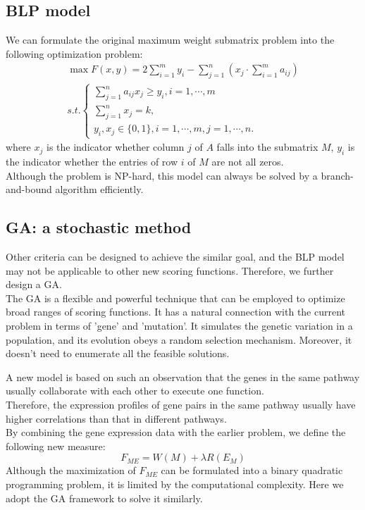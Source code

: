 \documentclass[xcolor=dvipsnames]{beamer}
\begin{document}
\subsection{BLP model}
\begin{frame}
We can formulate the original maximum weight submatrix problem into the following optimization problem:\\
\begin{eqnarray}
\max F(x,y)=2\sum_{i=1}^my_i-\sum_{j=1}^n(x_j\cdot\sum_{i=1}^ma_{ij})\nonumber\\
s.t.
\left\{
\begin{array}{c}
\sum_{j=1}^na_{ij}x_j\geqslant y_i, i=1,\cdots,m\\
\sum_{j=1}^nx_j=k,\\
y_i,x_j\in\{0,1\},i=1,\cdots,m,j=1,\cdots,n.
\end{array}
\right.\nonumber
\end{eqnarray}
where $x_j$ is the indicator whether column $j$ of $A$ falls into the submatrix $M$, $y_i$ is the indicator whether the entries of row $i$ of $M$ are not all zeros.\\
Although the problem is NP-hard, this model can always be solved by a branch-and-bound algorithm efficiently.\\
\end{frame}
\subsection{GA: a stochastic method}
\begin{frame}
Other criteria can be designed to achieve the similar goal, and the BLP model may not be applicable to other new scoring functions. Therefore, we further design a GA.\\
The GA is a flexible and powerful technique that can be employed to optimize broad ranges of scoring functions. It has a natural connection with the current problem in terms of 'gene' and 'mutation'. It simulates the genetic variation in a population, and its evolution obeys a random selection mechanism. Moreover, it doesn't need to enumerate all the feasible solutions.\\
\end{frame}
\begin{frame}
A new model is based on such an observation that the genes in the same pathway usually collaborate with each other to execute one function.\\
Therefore, the expression profiles of gene pairs in the same pathway usually have higher correlations than that in different pathways.\\
By combining the gene expression data with the earlier problem, we define the following new measure:
\[
F_{ME}=W(M)+\lambda R(E_M)
\]
Although the maximization of $F_{ME}$ can be formulated into a binary quadratic programming problem, it is limited by the computational complexity. Here we adopt the GA framework to solve it similarly.\\
\end{frame}
\end{document}
